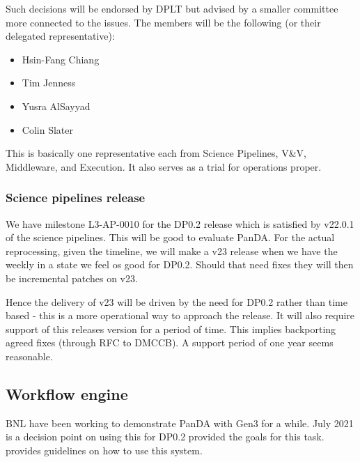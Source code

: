 Such decisions will be endorsed by DPLT but advised by a smaller committee more connected to the issues.
The members will be the following (or their delegated representative):

\begin{itemize}
\item Hsin-Fang Chiang
\item Tim Jenness
\item Yusra AlSayyad
\item Colin Slater
\end{itemize}

This is basically  one representative each from Science Pipelines, V\&V, Middleware, and Execution.
It also serves as a trial for operations proper.

\subsubsection {Science pipelines release} \label{sec:release}
We have milestone L3-AP-0010  for the DP0.2 release which is satisfied by v22.0.1 of the science pipelines. This will be good to evaluate PanDA.
For the actual reprocessing, given the timeline, we will make a v23 release when we have the weekly in a state we feel os good for DP0.2.
Should that need fixes they will then be incremental patches on v23.

Hence the delivery of v23  will be driven by the need for DP0.2 rather than time based - this is a more operational way to approach the release.
It will also require support of this releases version for a period of time. This implies backporting agreed fixes (through RFC to DMCCB). A support period of one year seems reasonable.
\subsection {Workflow engine}
BNL have been working to demonstrate PanDA with Gen3 for a while. July 2021 is a decision point on using this for DP0.2
 provided the goals for this task.  provides guidelines on how to use this system.


